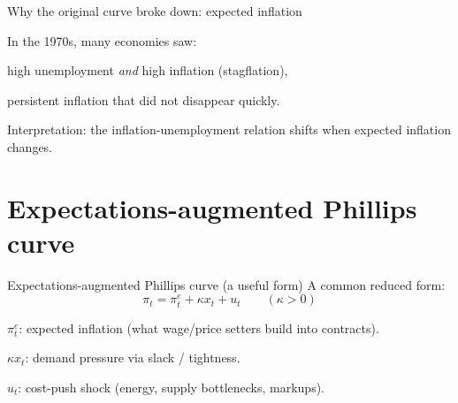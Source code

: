 \documentclass[aspectratio=169,xcolor=dvipsnames]{beamer}
\let\tempone\itemize
\let\temptwo\enditemize
\renewenvironment{itemize}{\tempone\addtolength{\itemsep}{\fill}}{\temptwo}
\begin{document}
\begin{frame}{Why the original curve broke down: expected inflation}
\begin{itemize}
\item In the 1970s, many economies saw:
\begin{itemize}
\item high unemployment \emph{and} high inflation (stagflation),
\item persistent inflation that did not disappear quickly.
\end{itemize}
\item Interpretation: the inflation-unemployment relation shifts when expected inflation changes.
\end{itemize}
\end{frame}

\section{Expectations-augmented Phillips curve}

\begin{frame}{Expectations-augmented Phillips curve (a useful form)}
\small
A common reduced form:
\[
\pi_t = \pi_t^e + \kappa x_t + u_t
\qquad (\kappa>0)
\]
\begin{itemize}
\item $\pi_t^e$: expected inflation (what wage/price setters build into contracts).
\item $\kappa x_t$: demand pressure via slack / tightness.
\item $u_t$: cost-push shock (energy, supply bottlenecks, markups).
\end{itemize}
\end{frame}
\end{document}
